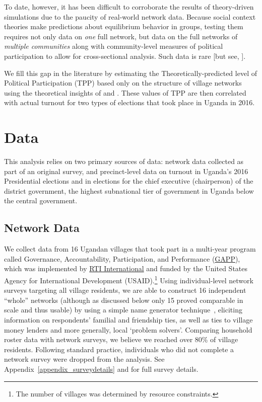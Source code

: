 \documentclass[12pt]{article}
\begin{document}
To date, however, it has been difficult to corroborate the results of theory-driven simulations due to the paucity of real-world network data. Because social context theories make predictions about equilibrium behavior in groups, testing them requires not only data on \emph{one} full network, but data on the full networks of \emph{multiple communities} along with community-level measures of political participation to allow for cross-sectional analysis. Such data is rare [but see, \citet{cruz2017politician}].

We fill this gap in the literature by estimating the Theoretically-predicted level of Political Participation (TPP) based only on the structure of village networks using the theoretical insights of \cite{Siegel:2009vi} and \cite{Rolfe:2012ka}. These values of TPP are then correlated with actual turnout for two types of elections that took place in Uganda in 2016.


\section{Data}\label{section_data}

This analysis relies on two primary sources of data: network data collected as part of an original survey, and precinct-level data on turnout in Uganda's 2016 Presidential elections and in elections for the chief executive (chairperson) of the district government, the highest subnational tier of government in Uganda below the central government.

\subsection{Network Data}\label{section_data_network}

We collect data from 16 Ugandan villages that took part in a multi-year program called Governance, Accountability, Participation, and Performance (\href{https://www.rti.org/impact/uganda-governance-accountability-participation-and-performance-gapp}{GAPP}), which was implemented by \href{https://www.rti.org/}{RTI International} and funded by the United States Agency for International Development (USAID).\footnote{The number of villages was determined by resource constraints.} Using individual-level network surveys targeting all village residents, we are able to construct 16 independent ``whole'' networks (although as discussed below only 15 proved comparable in scale and thus usable) by using a simple name generator technique~\citep{Knoke:2008vc}, eliciting information on respondents' familial and friendship ties, as well as ties to village money lenders and more generally, local `problem solvers'. Comparing household roster data with network surveys, we believe we reached over 80\% of village residents. Following standard practice, individuals who did not complete a network survey were dropped from the analysis. See Appendix~\ref{appendix_surveydetails} and \citet{Ferrali:uIYD9guX} for full survey details.
\end{document}

